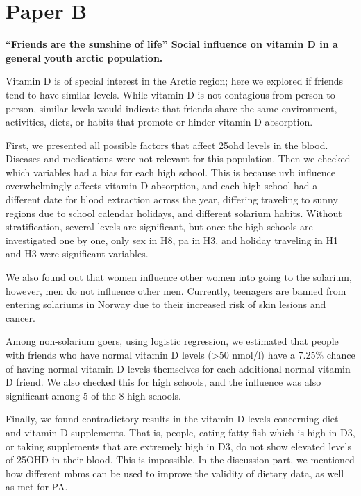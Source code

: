 \section{Paper B}

\textbf{“Friends are the sunshine of life” Social influence on vitamin D in a general youth arctic population.}

Vitamin D is of special interest in the Arctic region; here we explored if friends tend to have similar levels. While vitamin D is not contagious from person to person, similar levels would indicate that friends share the same environment, activities, diets, or habits that promote or hinder vitamin D absorption.

First, we presented all possible factors that affect \gls{25ohd} levels in the blood. Diseases and medications were not relevant for this population. Then we checked which variables had a bias for each high school. This is because \gls{uvb} influence overwhelmingly affects vitamin D absorption, and each high school had a different date for blood extraction across the year, differing traveling to sunny regions due to school calendar holidays, and different solarium habits. Without stratification, several levels are significant, but once the high schools are investigated one by one, only sex in H8, \gls{pa} in H3, and holiday traveling in H1 and H3 were significant variables.

We also found out that women influence other women into going to the solarium, however, men do not influence other men. Currently, teenagers are banned from entering solariums in Norway due to their increased risk of skin lesions and cancer.

Among non-solarium goers, using logistic regression, we estimated that people with friends who have normal vitamin D levels (>50 nmol/l) have a 7.25\% chance of having normal vitamin D levels themselves for each additional normal vitamin D friend. We also checked this for high schools, and the influence was also significant among 5 of the 8 high schools.

Finally, we found contradictory results in the vitamin D levels concerning diet and vitamin D supplements. That is, people, eating fatty fish which is high in D3, or taking supplements that are extremely high in D3, do not show elevated levels of 25OHD in their blood. This is impossible. In the discussion part, we mentioned how different \gls{mbms} can be used to improve the validity of dietary data, as well as \gls{met} for PA.


